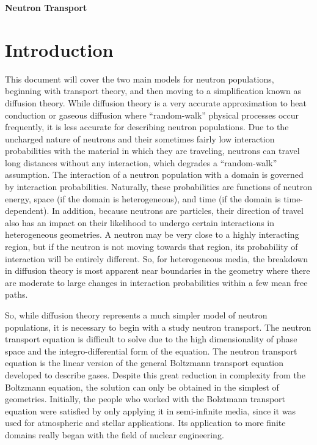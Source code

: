\documentclass[10pt]{article}
\begin{document}
\begin{centering}
\textbf{\Large Neutron Transport}\\
\end{centering}

\tableofcontents
\clearpage

\section{Introduction}
\begin{flushleft}\justify

This document will cover the two main models for neutron populations, beginning with transport theory, and then moving to a simplification known as diffusion theory. While diffusion theory is a very accurate approximation to heat conduction or gaseous diffusion where ``random-walk'' physical processes occur frequently, it is less accurate for describing neutron populations. Due to the uncharged nature of neutrons and their sometimes fairly low interaction probabilities with the material in which they are traveling, neutrons can travel long distances without any interaction, which degrades a ``random-walk'' assumption. The interaction of a neutron population with a domain is governed by interaction probabilities. Naturally, these probabilities are functions of neutron energy, space (if the domain is heterogeneous), and time (if the domain is time-dependent). In addition, because neutrons are particles, their direction of travel also has an impact on their likelihood to undergo certain interactions in heterogeneous geometries. A neutron may be very close to a highly interacting region, but if the neutron is not moving towards that region, its probability of interaction will be entirely different. So, for heterogeneous media, the breakdown in diffusion theory is most apparent near boundaries in the geometry where there are moderate to large changes in interaction probabilities within a few mean free paths. 

So, while diffusion theory represents a much simpler model of neutron populations, it is necessary to begin with a study neutron transport. The neutron transport equation is difficult to solve due to the high dimensionality of phase space and the integro-differential form of the equation. The neutron transport equation is the linear version of the general Boltzmann transport equation developed to describe gases. Despite this great reduction in complexity from the Boltzmann equation, the solution can only be obtained in the simplest of geometries. Initially, the people who worked with the Bolztmann transport equation were satisfied by only applying it in semi-infinite media, since it was used for atmospheric and stellar applications. Its application to more finite domains really began with the field of nuclear engineering. 


\end{flushleft}
\end{document}
